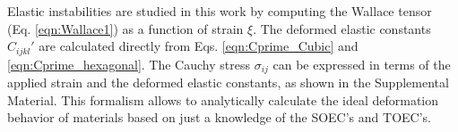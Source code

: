 \documentclass[showpacs,aps,floatfix,prb,reprint,superscriptaddress]{revtex4-1}
\begin{document}
Elastic instabilities are studied in this work by computing the Wallace tensor (Eq. \ref{eqn:Wallace1}) as a function of strain $\xi$. The deformed elastic constants $C_{ijkl}'$ are calculated directly from Eqs. \ref{eqn:Cprime_Cubic} and \ref{eqn:Cprime_hexagonal}. The Cauchy stress $\sigma_{ij}$ can be expressed in terms of the applied strain and the deformed elastic constants, as shown in the Supplemental Material. This formalism allows to analytically calculate the ideal deformation behavior of materials based on just a knowledge of the SOEC's and TOEC's.




\end{document}
